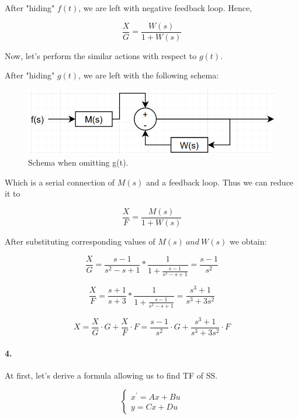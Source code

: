 \documentclass{article}
\begin{document}
        After "hiding" $f(t)$, we are left with negative feedback loop. Hence,
        
        $$\frac{X}{G} = \frac{W(s)}{1 + W(s)}$$
        
        Now, let's perform the similar actions with respect to $g(t)$.
        
        After "hiding" $g(t)$, we are left with the following schema:
        
        \begin{figure}[hbt!]
            \centering
            \includegraphics[scale=0.2]{hm2_3.png}
            \caption{Schema when omitting g(t).}
        \end{figure}
        
        Which is a serial connection of $M(s)$ and a feedback loop.
        Thus we can reduce it to 
        
        $$\frac{X}{F} = \frac{M(s)}{1 + W(s)}$$
        
        
        After substituting corresponding values of $M(s) \ and \ W(s)$ we obtain:
        
        $$\frac{X}{G} = \frac{s-1}{s^2 - s + 1} * \frac{1}{ 1 + \frac{s-1}{s^2 - s + 1}} = \frac{s-1}{s^2}$$
        
        $$\frac{X}{F} = \frac{s+1}{s + 3} * \frac{1}{ 1 + \frac{s-1}{s^2 - s + 1}} = \frac{s^3 + 1}{s^3 + 3s^2}$$
        
        $$X = \frac{X}{G} \cdot G + \frac{X}{F} \cdot F = \frac{s-1}{s^2} \cdot G + \frac{s^3 + 1}{s^3 + 3s^2} \cdot F$$
            
        \paragraph{4.}
        
        At first, let's derive a formula allowing us to find TF of SS.
        
        $$\left\{ \begin{array}{ll} 
                x^\prime = Ax + Bu\\
                y = Cx + Du
            \end{array} \right.$$
        
\end{document}
